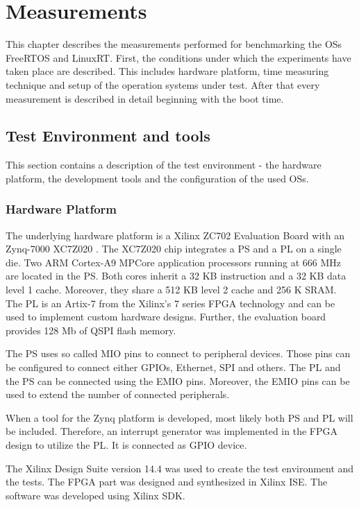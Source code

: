 \chapter{Measurements}\label{ch_measurements}
This chapter describes the measurements performed for benchmarking the \acp{OS} FreeRTOS and LinuxRT.
First, the conditions under which the experiments have taken place are described.
This includes hardware platform, time measuring technique and setup of the operation systems under test.
After that every measurement is described in detail beginning with the boot time.

\section{Test Environment and tools}
This section contains a description of the test environment - the hardware platform, the development tools and the configuration of the used \acp{OS}.
\subsection{Hardware Platform}
The underlying hardware platform is a Xilinx ZC702 Evaluation Board \cite{xilinx:zc702_ev_board} with an Zynq-7000 XC7Z020 \cite{xilinx:zynq7000}.
The XC7Z020 chip integrates a \ac{PS} and a \ac{PL} on a single die.
Two ARM Cortex-A9 MPCore application processors running at 666 MHz are located in the \ac{PS}.
Both cores inherit a 32 KB instruction and a 32 KB data level 1 cache.
Moreover, they share a 512 KB level 2 cache and 256 K SRAM.
The \ac{PL} is an Artix-7 from the Xilinx's 7 series FPGA technology and can be used to implement custom hardware designs.
Further, the evaluation board provides 128 Mb of \ac{QSPI} flash memory.
\par
The \ac{PS} uses so called \ac{MIO} pins to connect to peripheral devices.
Those pins can be configured to connect either \acp{GPIO}, Ethernet, \ac{SPI} and others.
The \ac{PL} and the \ac{PS} can be connected using the \ac{EMIO} pins.
Moreover, the \ac{EMIO} pins can be used to extend the number of connected peripherals.
\par
When a tool for the Zynq platform is developed, most likely both \ac{PS} and \ac{PL} will be included.
Therefore, an interrupt generator was implemented in the  \ac{FPGA} design to utilize the \ac{PL}.
It is connected as \ac{GPIO} device.
\par
The Xilinx Design Suite version 14.4 was used to create the test environment and the tests.
The \ac{FPGA} part was designed and synthesized in Xilinx \ac{ISE}.
The software was developed using Xilinx \ac{SDK}.

